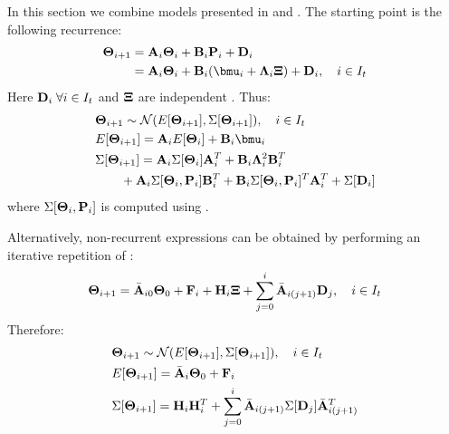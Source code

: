 In this section we combine models presented in  and . The starting point is the following recurrence:
\begin{align}
  \vtemperature_{i + 1} & = \m{A}_i \vtemperature_i + \m{B}_i \vpower_i + \m{D}_i \nonumber \\
  & = \m{A}_i \vtemperature_i + \m{B}_i(\vmean{i} + \ddeviation{i} \vstdnormal) + \m{D}_i, \sep i \in \timeindex \equlabel{fourier-recurrence-noise-process-variation}
\end{align}
Here $\mathbf{D}_i \; \forall i \in I_t$ and $\mathbf{\Xi}$ are independent \mnrvs. Thus:
\begin{align*}
  & \vtemperature_{i + 1} \sim \normal(\expectation{\vtemperature_{i + 1}}, \covariance{\vtemperature_{i + 1}}), \sep i \in \timeindex \\
  & \expectation{\vtemperature_{i + 1}} = \m{A}_i \expectation{\vtemperature_i} + \m{B}_i \vmean{i} \\
  & \covariance{\vtemperature_{i + 1}} = \m{A}_i \covariance{\vtemperature_i} \m{A}_i^T + \m{B}_i \ddeviation{i}^2 \m{B}_i^T \\
  & {} \qquad + \m{A}_i \covariance{\vtemperature_i, \vpower_i} \m{B}_i^T + \m{B}_i \covariance{\vtemperature_i, \vpower_i}^T \m{A}_i^T + \covariance{\m{D}_i}
\end{align*}
where $\Sigma[\mathbf{\Theta}_i, \mathbf{P}_i]$ is computed using .

Alternatively, non-recurrent expressions can be obtained by performing an iterative repetition of :
\begin{equation} \equlabel{fourier-non-recurrent-combined}
  \vtemperature_{i + 1} = \am{A}_{i0} \vtemperature_0 + \v{F}_i + \v{H}_i \vstdnormal + \sum_{j = 0}^{i} \am{A}_{i(j+1)} \m{D}_j, \sep i \in \timeindex
\end{equation}
Therefore:
\begin{align*}
  & \mathbf{\Theta}_{i + 1} \sim \mathcal{N}(E[\mathbf{\Theta}_{i + 1}], \Sigma[\mathbf{\Theta}_{i + 1}]), \hspace{10pt} i \in I_t \\
  & E[\mathbf{\Theta}_{i + 1}] = \Bar{\mathbf{A}}_i \mathbf{\Theta}_0 + \mathbf{F}_i \\
  & \Sigma[\mathbf{\Theta}_{i + 1}] = \mathbf{H}_i \mathbf{H}_i^T + \sum_{j = 0}^{i} \Bar{\mathbf{A}}_{i(j+1)} \Sigma[\mathbf{D}_j] \Bar{\mathbf{A}}_{i(j+1)}^T
\end{align*}
